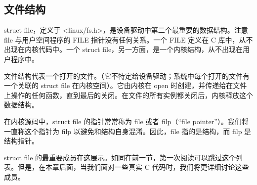 \documentclass[lang=cn,newtx,10pt,scheme=chinese]{elegantbook}
\begin{document}
\subsection{文件结构}

struct file，定义于 <linux/fs.h>，是设备驱动中第二个最重要的数据结构。注意 file 与用户空间程序的 FILE 指针没有任何关系。一个 FILE 定义在 C 库中，从不出现在内核代码中。一个 struct file，另一方面，是一个内核结构，从不出现在用户程序中。

文件结构代表一个打开的文件。（它不特定给设备驱动；系统中每个打开的文件有一个关联的 struct file 在内核空间）。它由内核在 open 时创建，并传递给在文件上操作的任何函数，直到最后的关闭。在文件的所有实例都关闭后，内核释放这个数据结构。

在内核源码中，struct file 的指针常常称为 file 或者 filp（``file pointer''）。我们将一直称这个指针为 filp 以避免和结构自身混淆。因此，file 指的是结构，而 filp 是结构指针。

struct file 的最重要成员在这展示。如同在前一节，第一次阅读可以跳过这个列表。但是，在本章后面，当我们面对一些真实 C 代码时，我们将更详细讨论这些成员。
\end{document}
